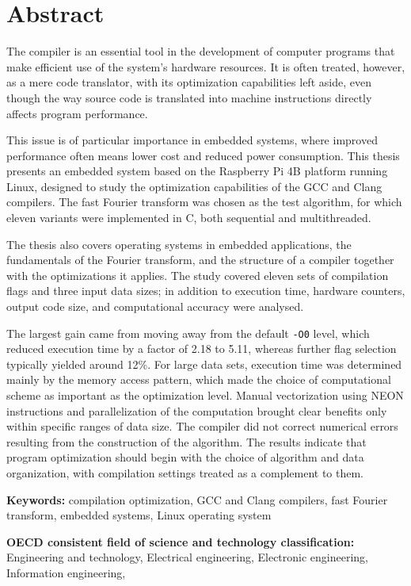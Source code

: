 \chapter*{Abstract}
The compiler is an essential tool in the development of computer programs that
make efficient use of the system's hardware resources. It is often treated,
however, as a mere code translator, with its optimization capabilities left
aside, even though the way source code is translated into machine instructions
directly affects program performance.

This issue is of particular importance in embedded systems, where improved
performance often means lower cost and reduced power consumption. This thesis
presents an embedded system based on the Raspberry Pi 4B platform running Linux,
designed to study the optimization capabilities of the GCC and Clang compilers.
The fast Fourier transform was chosen as the test algorithm, for which eleven
variants were implemented in C, both sequential and multithreaded.

The thesis also covers operating systems in embedded applications, the
fundamentals of the Fourier transform, and the structure of a compiler together
with the optimizations it applies. The study covered eleven sets of compilation
flags and three input data sizes; in addition to execution time, hardware
counters, output code size, and computational accuracy were analysed.

The largest gain came from moving away from the default \texttt{-O0} level,
which reduced execution time by a factor of 2.18 to 5.11, whereas further flag
selection typically yielded around 12\%. For large data sets, execution time was
determined mainly by the memory access pattern, which made the choice of
computational scheme as important as the optimization level. Manual
vectorization using NEON instructions and parallelization of the computation
brought clear benefits only within specific ranges of data size. The compiler
did not correct numerical errors resulting from the construction of the
algorithm. The results indicate that program optimization should begin with the
choice of algorithm and data organization, with compilation settings treated as
a complement to them.

\bigskip

\noindent\textbf{Keywords:} compilation optimization, GCC and Clang compilers,
fast Fourier transform, embedded systems, Linux operating system

\bigskip

\noindent\textbf{OECD consistent field of science and technology classification:} Engineering and technology, Electrical engineering, Electronic engineering, Information engineering, 
